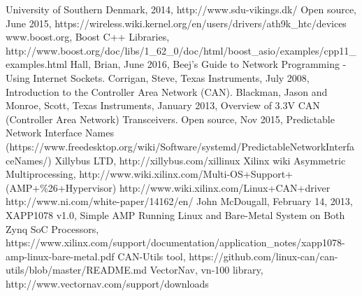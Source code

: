 \begin{thebibliography}{11} %
			University of Southern Denmark, 2014, http://www.sdu-vikings.dk/
			Open source, June 2015, https://wireless.wiki.kernel.org/en/users/drivers/ath9k\_htc/devices
			www.boost.org, Boost C++ Libraries, http://www.boost.org/doc/libs/1\_62\_0/doc/html/boost\_asio/examples/cpp11\_examples.html
			Hall, Brian, June 2016, Beej's Guide to Network Programming - Using Internet Sockets.
			Corrigan, Steve, Texas Instruments, July 2008, Introduction to the Controller Area Network (CAN).
			Blackman, Jason and Monroe, Scott, Texas Instruments, January 2013, Overview of 3.3V CAN (Controller Area Network) Transceivers.
			Open source, Nov 2015, Predictable Network Interface Names (https://www.freedesktop.org/wiki/Software/systemd/PredictableNetworkInterfaceNames/)
			Xillybus LTD, http://xillybus.com/xillinux
			Xilinx wiki Asymmetric Multiprocessing, http://www.wiki.xilinx.com/Multi-OS+Support+(AMP+\%26+Hypervisor)
			http://www.wiki.xilinx.com/Linux+CAN+driver
			http://www.ni.com/white-paper/14162/en/
			John McDougall, February 14, 2013, XAPP1078 v1.0, Simple AMP Running Linux and Bare-Metal System on Both Zynq SoC Processors, https://www.xilinx.com/support/documentation/application\_notes/xapp1078-amp-linux-bare-metal.pdf
			CAN-Utils tool, https://github.com/linux-can/can-utils/blob/master/README.md
			VectorNav, vn-100 library, http://www.vectornav.com/support/downloads
\end{thebibliography}
